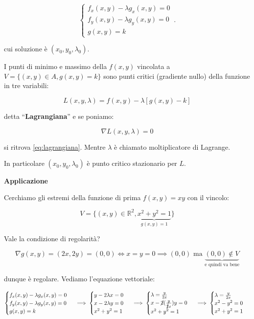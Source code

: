 \documentclass[../appunti-analisi.tex]{subfiles}
\begin{document}
\begin{equation}\label{eq:lagrangiana}
    \begin{cases}
           f_x(x,y) - \lambda g_x(x,y) = 0\\
           f_y(x,y) - \lambda g_y(x,y) = 0\\
           g(x,y) =k
    \end{cases}\,.
\end{equation}

cui soluzione è $(x_0,y_0,\lambda_0)$. 

I punti di minimo e massimo della $f(x,y)$ vincolata a $V= \{(x,y) \in A, g(x,y) = k\}$ sono punti critici (gradiente nullo) della funzione in tre variabili:

\[
    L(x,y,\lambda) = f(x,y) - \lambda [g(x,y) -k]
\]

detta ``\textbf{Lagrangiana}'' e se poniamo:

\[
    \nabla L(x,y,\lambda) = 0
\]

si ritrova \ref{eq:lagrangiana}. Mentre $\lambda$ è chiamato moltiplicatore di Lagrange.

In particolare $(x_0,y_0, \lambda_0)$ è punto critico stazionario per $L$.

\newpage

\textbf{Applicazione} 

Cerchiamo gli estremi della funzione di prima $f(x,y) = xy$ con il vincolo:

\[
    V= \{(x,y) \in \mathbb{R}^{2}, \underbrace{x^{2}+y^{2} = 1}_\text{$g(x,y) = 1$}\}
\]

Vale la condizione di regolarità?

\[
    \nabla g(x,y) = (2x,2y) = (0,0) \Leftrightarrow x=y=0 \implies (0,0) \text{ ma } \underbrace{(0,0) \notin V}_\text{e quindi va bene}
\]

dunque è regolare. Vediamo l'equazione vettoriale:

\[
        \begin{cases}
               f_x(x,y) - \lambda g_x(x,y) = 0\\
               f_y(x,y) - \lambda g_y(x,y) = 0\\
               g(x,y) = k
        \end{cases}\, \implies
        \begin{cases}
               y -2 \lambda x= 0\\
               x -2 \lambda y = 0\\
               x^{2}+ y^{2}= 1
        \end{cases}\, \implies
        \begin{cases}
               \lambda= \frac{y}{2x}\\
               x-\cancel{2}( \frac{y}{\cancel{2}x})y= 0\\
               x^{2}+ y^{2}= 1
        \end{cases}\, \implies
        \begin{cases}
               \lambda= \frac{y}{2x}\\
               x^{2}-y^{2}= 0\\
               x^{2}+ y^{2}= 1
        \end{cases}\, 
\]
\end{document}

